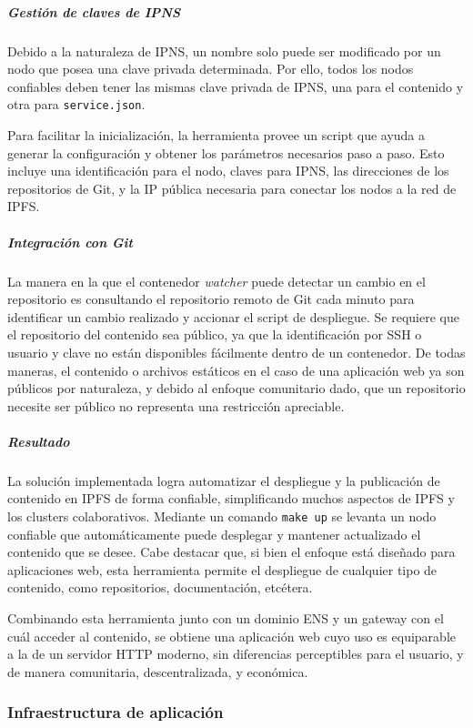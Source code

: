 \subparagraph{Gestión de claves de IPNS}

Debido a la naturaleza de IPNS, un nombre solo puede ser modificado por un nodo que posea una clave privada determinada. Por ello, todos los nodos confiables deben tener las mismas clave privada de IPNS, una para el contenido y otra para \texttt{service.json}.

Para facilitar la inicialización, la herramienta provee un script que ayuda a generar la configuración y obtener los parámetros necesarios paso a paso. Esto incluye una identificación para el nodo, claves para IPNS, las direcciones de los repositorios de Git, y la IP pública necesaria para conectar los nodos a la red de IPFS.

\subparagraph{Integración con Git}

La manera en la que el contenedor \textit{watcher} puede detectar un cambio en el repositorio es consultando el repositorio remoto de Git cada minuto para identificar un cambio realizado y accionar el script de despliegue. Se requiere que el repositorio del contenido sea público, ya que la identificación por SSH o usuario y clave no están disponibles fácilmente dentro de un contenedor. De todas maneras, el contenido o archivos estáticos en el caso de una aplicación web ya son públicos por naturaleza, y debido al enfoque comunitario dado, que un repositorio necesite ser público no representa una restricción apreciable.

\subparagraph{Resultado}

La solución implementada logra automatizar el despliegue y la publicación de contenido en IPFS de forma confiable, simplificando muchos aspectos de IPFS y los clusters colaborativos. Mediante un comando \texttt{make up} se levanta un nodo confiable que automáticamente puede desplegar y mantener actualizado el contenido que se desee. Cabe destacar que, si bien el enfoque está diseñado para aplicaciones web, esta herramienta permite el despliegue de cualquier tipo de contenido, como repositorios, documentación, etcétera.

Combinando esta herramienta junto con un dominio ENS y un gateway con el cuál acceder al contenido, se obtiene una aplicación web cuyo uso es equiparable a la de un servidor HTTP moderno, sin diferencias perceptibles para el usuario, y de manera comunitaria, descentralizada, y económica.

\subsubsection{Infraestructura de aplicación}

